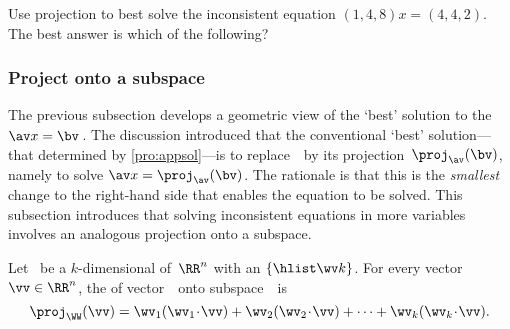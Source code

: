 \begin{activity}
Use projection to best solve the inconsistent equation \((1,4,8)x=(4,4,2)\). 
The best answer is which of the following?
\end{activity}











\subsubsection{Project onto a subspace}

The previous subsection develops a geometric view of the `best' solution to the  \(\av x=\bv\)\,.
The discussion introduced that the conventional `best' solution---that determined by \autoref{pro:appsol}---is to replace~\bv\ by its projection~\(\proj_{\av}(\bv)\), namely to solve \(\av x=\proj_{\av}(\bv)\).
The rationale is that this is the \emph{smallest} change to the right-hand side that enables the equation to be solved.  
This subsection introduces that solving inconsistent equations in more variables involves an analogous projection onto a subspace.



\begin{definition} \label{def:orthproj}
Let \WW\ be a \(k\)-dimensional  of~\(\RR^n\) with an  \(\{\hlist\wv k\}\).
For every vector \(\vv\in\RR^n\), the  of vector~\vv\ onto subspace~\WW\ is
\begin{equation*}
\proj_\WW(\vv)=\wv_1(\wv_1\cdot\vv)+\wv_2(\wv_2\cdot\vv)+\cdots+\wv_k(\wv_k\cdot\vv).
\end{equation*}
\end{definition}

